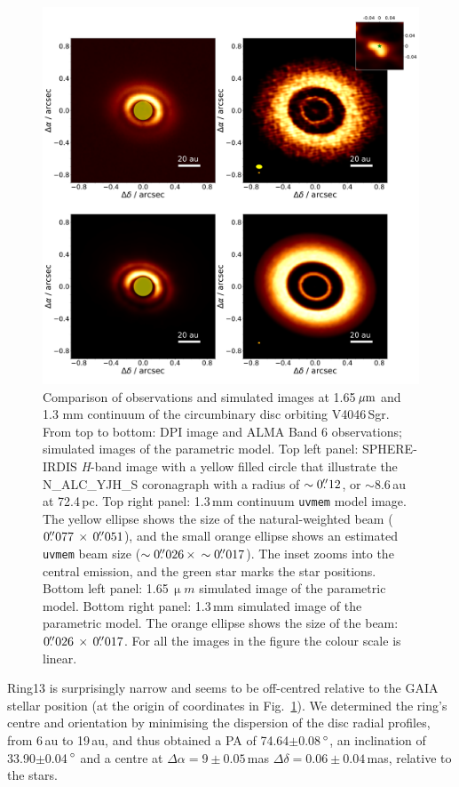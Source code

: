 \documentclass[letters,usenatbib,times]{mnras}
\begin{document}
\begin{figure}
  \includegraphics[width=\textwidth]{hot_two_E.pdf}
  \caption{Comparison of observations and simulated images at 1.65\,$\hbox{$\mu$m}$ and 1.3 mm continuum of the circumbinary disc orbiting V4046\,Sgr. From top to bottom: DPI image and ALMA Band 6 observations; simulated images of the parametric model. Top left panel: SPHERE-IRDIS \textit{H}-band image with a yellow filled circle that illustrate the N\_ALC\_YJH\_S coronagraph with a radius of $\sim0\hbox{$.\!\!^{\prime\prime}$}12$, or $\sim$8.6\,au at 72.4\,pc. Top right panel: 1.3\,mm continuum {\tt uvmem} model image. The yellow ellipse shows the size of the natural-weighted beam ($ 0\hbox{$.\!\!^{\prime\prime}$}077 \, \times \, 0\hbox{$.\!\!^{\prime\prime}$}051$), and the small orange ellipse shows an estimated {\tt uvmem} beam size ($\sim0\hbox{$.\!\!^{\prime\prime}$}026 \, \times \, \sim0\hbox{$.\!\!^{\prime\prime}$}017$). The inset zooms into the central emission, and the green star marks the star positions. Bottom left panel: 1.65\,$\upmu m$ simulated image of the parametric model. Bottom right panel: 1.3\,mm simulated image of the parametric model. The orange ellipse shows the size of the beam: $0\hbox{$.\!\!^{\prime\prime}$}026 \, \times \, 0\hbox{$.\!\!^{\prime\prime}$}017$. For all the images in the figure the colour scale is linear.}
  \label{fig:images_vs_simulated}
\end{figure}

Ring13 is surprisingly narrow and seems to be off-centred relative to the GAIA stellar position (at the origin of coordinates in Fig.~\ref{fig:images_vs_simulated}). We determined the ring's centre and orientation by minimising the dispersion of the disc radial profiles, from 6\,au to 19\,au, and thus obtained a PA of 74.64$\pm$0.08\,$\hbox{$^\circ$}$, an inclination of 33.90$\pm$0.04\,$\hbox{$^\circ$}$ and a centre at $\Delta \alpha = 9\pm0.05$\,mas $\Delta \delta = 0.06\pm0.04$\,mas, relative to the stars.
\end{document}
